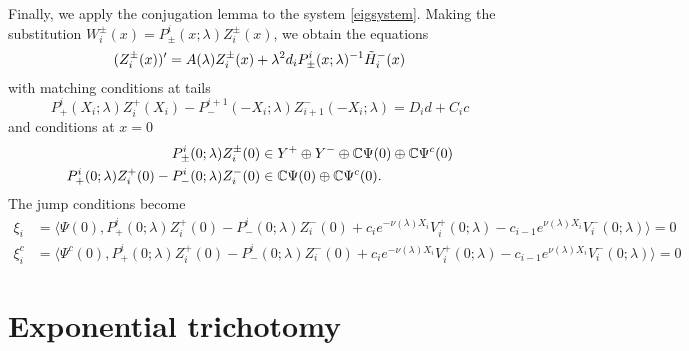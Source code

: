 \documentclass[thesis.tex]{subfiles}
\begin{document}
Finally, we apply the conjugation lemma to the system \cref{eigsystem}. Making the substitution $W_i^\pm(x) = P^i_\pm(x; \lambda) Z_i^\pm(x)$, we obtain the equations
\begin{equation}\label{systemZ}
(Z_i^\pm(x))' = A(\lambda) Z_i^\pm(x) + \lambda^2 d_i P^i_\pm(x; \lambda)^{-1} \tilde{H}_i^-(x) \\
\end{equation}
with matching conditions at tails
\begin{equation}\label{systemmiddle}
P^i_+(X_i; \lambda) Z_i^+(X_i) - P^{i+1}_-(-X_i; \lambda) Z_{i+1}^-(-X_i; \lambda) = D_i d + C_i c 
\end{equation}
and conditions at $x = 0$
\begin{align}
P^i_\pm(0; \lambda) Z_i^\pm(0) &\in Y^+ \oplus Y^- \oplus \mathbb{C} \Psi(0) \oplus \mathbb{C} \Psi^c(0) \label{systemcenter1} \\
P^i_+(0; \lambda) Z_i^+(0) - P^i_-(0; \lambda) Z_i^-(0) &\in \mathbb{C} \Psi(0) \oplus \mathbb{C} \Psi^c(0) \label{systemcenter2}.
\end{align}
The jump conditions become
\begin{equation}\label{jumpcondZ}
\begin{aligned}
\xi_i &= \langle \Psi(0), P^i_+(0; \lambda) Z_i^+(0) - P^i_-(0; \lambda) Z_i^-(0) + c_i e^{-\nu(\lambda)X_i}V_i^+(0; \lambda) - c_{i-1} e^{\nu(\lambda)X_i} V_i^-(0; \lambda) \rangle = 0  \\
\xi_i^c &= \langle \Psi^c(0), P^i_+(0; \lambda) Z_i^+(0) - P^i_-(0; \lambda) Z_i^-(0) + c_i e^{-\nu(\lambda)X_i}V_i^+(0; \lambda) - c_{i-1} e^{\nu(\lambda)X_i} V_i^-(0; \lambda) \rangle = 0 
\end{aligned}
\end{equation}

\section{Exponential trichotomy}\label{sec:trichotomy}
\end{document}
